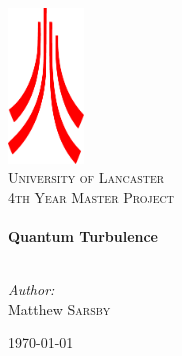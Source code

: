 
\begin{titlepage}

\begin{center}
\hspace{1cm} %
\vspace{4cm}

\includegraphics[width=0.15\textwidth]{./pics/logo}\\[1cm]    

\textsc{\LARGE University of Lancaster}\\[1.5cm]

\textsc{\Large 4th Year Master Project}\\[0.5cm]


\HRule \\[0.4cm]
{ \huge \bfseries Quantum Turbulence}\\[0.1cm]

\HRule \\[1.5cm]

\begin{minipage}{0.4\textwidth}
\begin{flushleft} \large
\emph{Author:}\\
Matthew \textsc{Sarsby}
\end{flushleft}
\end{minipage}
\begin{minipage}{0.4\textwidth}
\begin{flushright}

\end{flushright}
\end{minipage}

\vfill

{\large \today}

\end{center}

\end{titlepage}

